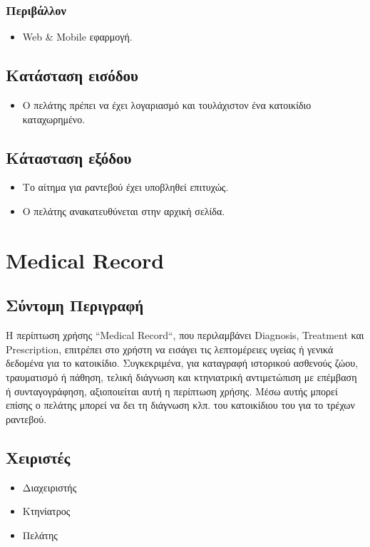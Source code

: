 \documentclass[12pt,a4paper,twoside]{book}
\begin{document}
\subsubsection{Περιβάλλον}
\begin{itemize}
  \item Web \& Mobile εφαρμογή.
\end{itemize}

\subsection{Κατάσταση εισόδου} %
\begin{itemize}
  \item Ο πελάτης πρέπει να έχει λογαριασμό και τουλάχιστον ένα κατοικίδιο καταχωρημένο. %
\end{itemize}

\subsection{Κάτασταση εξόδου} %
\begin{itemize}
  \item Το αίτημα για ραντεβού έχει υποβληθεί επιτυχώς.
  \item Ο πελάτης ανακατευθύνεται στην αρχική σελίδα. %
\end{itemize}

\section{Medical Record}

\subsection{Σύντομη Περιγραφή}
Η περίπτωση χρήσης “Medical Record“, που περιλαμβάνει Diagnosis, Treatment και Prescription, επιτρέπει στο χρήστη να εισάγει τις λεπτομέρειες υγείας ή γενικά δεδομένα για το κατοικίδιο. Συγκεκριμένα, για καταγραφή ιστορικού ασθενούς ζώου, τραυματισμό ή πάθηση, τελική διάγνωση και κτηνιατρική αντιμετώπιση με επέμβαση ή συνταγογράφηση, αξιοποιείται αυτή η περίπτωση χρήσης. Μέσω αυτής μπορεί επίσης ο πελάτης μπορεί να δει τη διάγνωση κλπ. του κατοικίδιου του για το τρέχων ραντεβού.  %

\subsection{Χειριστές}
\begin{itemize}
  \item Διαχειριστής
  \item Κτηνίατρος
  \item Πελάτης
\end{itemize}
\end{document}
